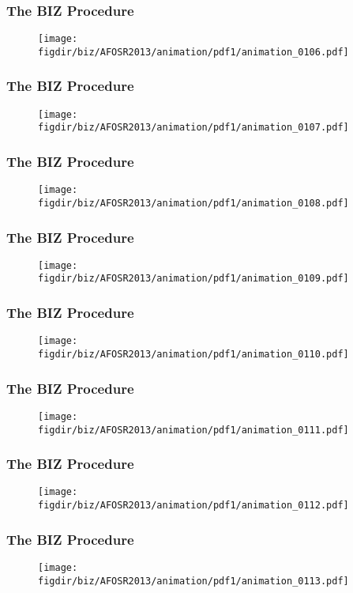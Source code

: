 \documentclass[13pt]{beamer}
\newcommand{\figdir}{../../fig}
\begin{document}
\begin{frame}\frametitle{The BIZ Procedure}\begin{figure}\texttt{[image: \\figdir/biz/AFOSR2013/animation/pdf1/animation\_0106.pdf]}\end{figure}\end{frame}
\begin{frame}\frametitle{The BIZ Procedure}\begin{figure}\texttt{[image: \\figdir/biz/AFOSR2013/animation/pdf1/animation\_0107.pdf]}\end{figure}\end{frame}
\begin{frame}\frametitle{The BIZ Procedure}\begin{figure}\texttt{[image: \\figdir/biz/AFOSR2013/animation/pdf1/animation\_0108.pdf]}\end{figure}\end{frame}
\begin{frame}\frametitle{The BIZ Procedure}\begin{figure}\texttt{[image: \\figdir/biz/AFOSR2013/animation/pdf1/animation\_0109.pdf]}\end{figure}\end{frame}
\begin{frame}\frametitle{The BIZ Procedure}\begin{figure}\texttt{[image: \\figdir/biz/AFOSR2013/animation/pdf1/animation\_0110.pdf]}\end{figure}\end{frame}
\begin{frame}\frametitle{The BIZ Procedure}\begin{figure}\texttt{[image: \\figdir/biz/AFOSR2013/animation/pdf1/animation\_0111.pdf]}\end{figure}\end{frame}
\begin{frame}\frametitle{The BIZ Procedure}\begin{figure}\texttt{[image: \\figdir/biz/AFOSR2013/animation/pdf1/animation\_0112.pdf]}\end{figure}\end{frame}
\begin{frame}\frametitle{The BIZ Procedure}\begin{figure}\texttt{[image: \\figdir/biz/AFOSR2013/animation/pdf1/animation\_0113.pdf]}\end{figure}\end{frame}
\end{document}
